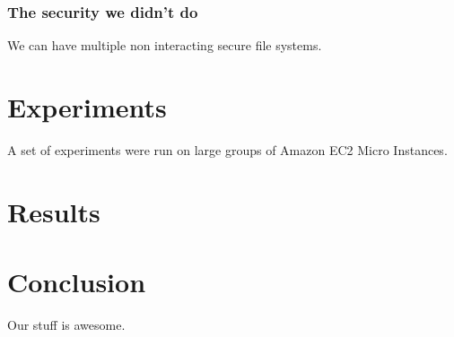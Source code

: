 \documentclass[conference, compsocconf, letterpaper]{IEEEtran}
\begin{document}
\subsubsection{The security we didn't do}
We can have multiple non interacting secure file systems.


\section{Experiments}
A set of experiments were run on large groups of Amazon EC2 Micro Instances\cite{amazon-micro}.
\section{Results}

\section{Conclusion}
Our stuff \cite{code} is awesome.



\end{document}
